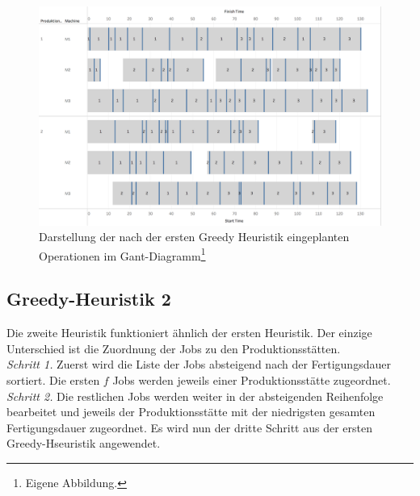 \documentclass[final, english, ngerman, a4paper, 12pt, %
numbers=noenddot,
cd=true,
cdfont=false,cdfont=nohead,cdfont=nodin,
cdmath=false,
cdhead=false,
cdfoot=true,
cdcover=monochrome,
cdgeometry=symmetric,
declaration=heading,
declaration=notoc,
abstract=heading,
]{tudscrreprt}
\begin{document}
\begin{figure}[H]
	\centering
	\includegraphics[width=\textwidth]{./settings/gh1}
	\caption[Interaktives Beispiel - Einplanung nach der ersten Greedy Heuristik]{Darstellung der nach der ersten Greedy Heuristik eingeplanten Operationen im Gant-Diagramm\footnote{Eigene Abbildung.}}\label{fig:gh1}
\end{figure}

\subsection{Greedy-Heuristik 2}

Die zweite Heuristik funktioniert ähnlich der ersten Heuristik. Der einzige Unterschied ist die Zuordnung der Jobs zu den Produktionsstätten. \\

\noindent
\textit{Schritt 1.} Zuerst wird die Liste der Jobs absteigend nach der Fertigungsdauer sortiert. Die ersten $f$ Jobs werden jeweils einer Produktionsstätte zugeordnet. \\

\noindent
\textit{Schritt 2.} Die restlichen Jobs werden weiter in der absteigenden Reihenfolge bearbeitet und jeweils der Produktionsstätte mit der niedrigsten gesamten Fertigungsdauer zugeordnet. Es wird nun der dritte Schritt aus der ersten Greedy-Hseuristik angewendet. \\
\end{document}
